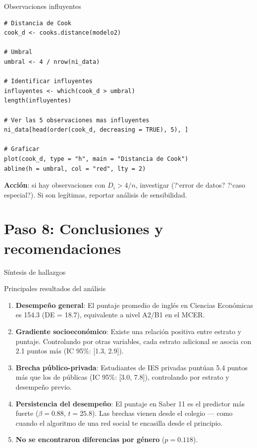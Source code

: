 \documentclass[aspectratio=169, 11pt]{beamer}
\begin{document}
\begin{frame}[fragile]{Observaciones influyentes}
\begin{lstlisting}
# Distancia de Cook
cook_d <- cooks.distance(modelo2)

# Umbral
umbral <- 4 / nrow(ni_data)

# Identificar influyentes
influyentes <- which(cook_d > umbral)
length(influyentes)

# Ver las 5 observaciones mas influyentes
ni_data[head(order(cook_d, decreasing = TRUE), 5), ]

# Graficar
plot(cook_d, type = "h", main = "Distancia de Cook")
abline(h = umbral, col = "red", lty = 2)
\end{lstlisting}

\footnotesize
\textbf{Acci\'on}: si hay observaciones con $D_i > 4/n$, investigar (?`error de datos? ?`caso especial?). Si son leg\'itimas, reportar an\'alisis de sensibilidad.
\end{frame}

\section{Paso 8: Conclusiones y recomendaciones}

\begin{frame}{Síntesis de hallazgos}
\begin{block}{Principales resultados del análisis}
\begin{enumerate}
\item \textbf{Desempeño general}: El puntaje promedio de inglés en Ciencias Econ\'omicas es 154.3 (DE = 18.7), equivalente a nivel A2/B1 en el MCER.

\item \textbf{Gradiente socioeconómico}: Existe una relación positiva entre estrato y puntaje. Controlando por otras variables, cada estrato adicional se asocia con 2.1 puntos más (IC 95\%: [1.3, 2.9]).

\item \textbf{Brecha público-privada}: Estudiantes de IES privadas puntúan 5.4 puntos más que los de públicas (IC 95\%: [3.0, 7.8]), controlando por estrato y desempeño previo.

\item \textbf{Persistencia del desempe\~no}: El puntaje en Saber 11 es el predictor m\'as fuerte ($\beta = 0.88$, $t = 25.8$). Las brechas vienen desde el colegio --- como cuando el algoritmo de una red social te encasilla desde el principio.

\item \textbf{No se encontraron diferencias por género} ($p = 0.118$).
\end{enumerate}
\end{block}
\end{frame}
\end{document}
